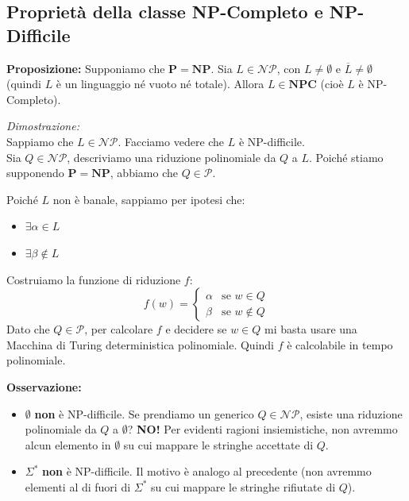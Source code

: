 \subsection{Proprietà della classe NP-Completo e NP-Difficile}

\textbf{Proposizione:} Supponiamo che $\mathbf{P = NP}$. Sia $L \in \mathcal{NP}$, con $L \neq \emptyset$ e $\overline{L} \neq \emptyset$ (quindi $L$ è un linguaggio né vuoto né totale). Allora $L \in \mathbf{NPC}$ (cioè $L$ è NP-Completo).

\vspace{0.2cm}
\textit{Dimostrazione:} \\
Sappiamo che $L \in \mathcal{NP}$. Facciamo vedere che $L$ è NP-difficile. \\
Sia $Q \in \mathcal{NP}$, descriviamo una riduzione polinomiale da $Q$ a $L$. Poiché stiamo supponendo $\mathbf{P = NP}$, abbiamo che $Q \in \mathcal{P}$. 

Poiché $L$ non è banale, sappiamo per ipotesi che:
\begin{itemize}
    \item $\exists \alpha \in L$
    \item $\exists \beta \notin L$
\end{itemize}

Costruiamo la funzione di riduzione $f$:
$$ f(w) = 
\begin{cases} 
\alpha & \text{se } w \in Q \\ 
\beta & \text{se } w \notin Q 
\end{cases} 
$$
Dato che $Q \in \mathcal{P}$, per calcolare $f$ e decidere se $w \in Q$ mi basta usare una Macchina di Turing deterministica polinomiale. Quindi $f$ è calcolabile in tempo polinomiale.

\vspace{0.4cm}
\textbf{Osservazione:}
\begin{itemize}
    \item $\emptyset$ \textbf{non} è NP-difficile. Se prendiamo un generico $Q \in \mathcal{NP}$, esiste una riduzione polinomiale da $Q$ a $\emptyset$? \textbf{NO!} Per evidenti ragioni insiemistiche, non avremmo alcun elemento in $\emptyset$ su cui mappare le stringhe accettate di $Q$.
    \item $\Sigma^*$ \textbf{non} è NP-difficile. Il motivo è analogo al precedente (non avremmo elementi al di fuori di $\Sigma^*$ su cui mappare le stringhe rifiutate di $Q$).
\end{itemize}

